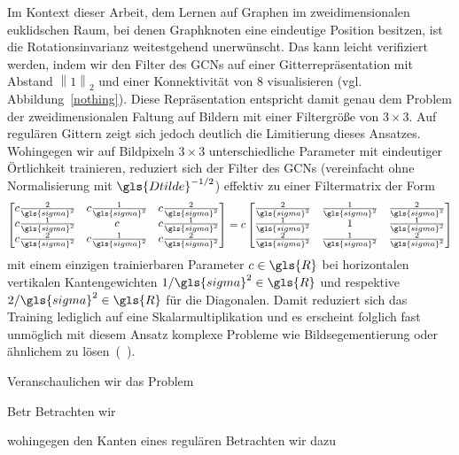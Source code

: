 Im Kontext dieser Arbeit, dem Lernen auf Graphen im zweidimensionalen euklidschen Raum, bei denen Graphknoten eine eindeutige Position besitzen, ist die Rotationsinvarianz weitestgehend unerwünscht.
Das kann leicht verifiziert werden, indem wir den Filter des \glspl{GCN} auf einer Gitterrepräsentation mit Abstand $\left\|1\right\|_2$ und einer Konnektivität von $8$ visualisieren (vgl. Abbildung~\ref{nothing}).
Diese Repräsentation entspricht damit genau dem Problem der zweidimensionalen Faltung auf Bildern mit einer Filtergröße von $3 \times 3$.
Auf regulären Gittern zeigt sich jedoch deutlich die Limitierung dieses Ansatzes.
Wohingegen wir auf Bildpixeln $3 \times 3$ unterschiedliche Parameter mit eindeutiger Örtlichkeit trainieren, reduziert sich der Filter des \glspl{GCN} (vereinfacht ohne Normalisierung mit $\gls{Dtilde}^{-1/2}$) effektiv zu einer Filtermatrix der Form
\begin{equation*}
  \begin{bmatrix}
    c \frac{2}{\gls{sigma}^2} & c \frac{1}{\gls{sigma}^2} & c \frac{2}{\gls{sigma}^2}\\
    c \frac{1}{\gls{sigma}^2} & c  & c \frac{1}{\gls{sigma}^2}\\
    c \frac{2}{\gls{sigma}^2} & c \frac{1}{\gls{sigma}^2} & c \frac{2}{\gls{sigma}^2}
  \end{bmatrix} = c \begin{bmatrix}
    \frac{2}{\gls{sigma}^2} & \frac{1}{\gls{sigma}^2} & \frac{2}{\gls{sigma}^2}\\
    \frac{1}{\gls{sigma}^2} & 1  & \frac{1}{\gls{sigma}^2}\\
    \frac{2}{\gls{sigma}^2} & \frac{1}{\gls{sigma}^2} & \frac{2}{\gls{sigma}^2}
  \end{bmatrix}
\end{equation*}
mit einem einzigen trainierbaren Parameter $c \in \gls{R}$ bei horizontalen \bzw{} vertikalen Kantengewichten $1/\gls{sigma}^2 \in \gls{R}$ und respektive $2/\gls{sigma}^2 \in \gls{R}$ für die Diagonalen.
Damit reduziert sich das Training lediglich auf eine Skalarmultiplikation und es erscheint folglich fast unmöglich mit diesem Ansatz komplexe Probleme wie Bildsegementierung oder ähnlichem zu lösen~(\vgl{}~\cite{gcn_review}).




Veranschaulichen wir das Problem

Betr
Betrachten wir

wohingegen den Kanten eines regulären
Betrachten wir dazu

